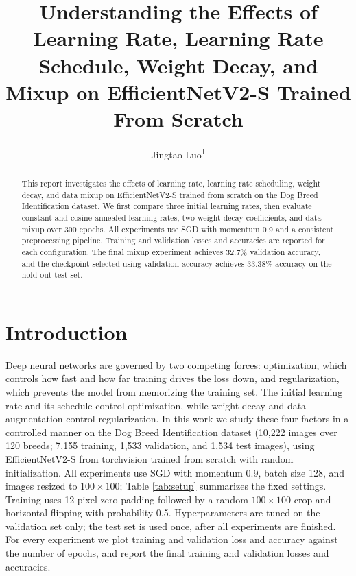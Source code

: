 \documentclass[letterpaper]{article} %
\title{Understanding the Effects of Learning Rate, Learning Rate Schedule, Weight Decay, and Mixup on EfficientNetV2-S Trained From Scratch}
\author{
    Jingtao Luo\textsuperscript{\rm 1}
}
\begin{document}
\maketitle

\begin{abstract}
This report investigates the effects of learning rate, 
learning rate scheduling, weight decay, and data mixup on EfficientNetV2-S 
trained from scratch on the Dog Breed Identification dataset.
We first compare three initial learning rates, 
then evaluate constant and cosine-annealed learning rates, 
two weight decay coefficients, and data mixup
over 300 epochs. All experiments use SGD with momentum 0.9 and 
a consistent preprocessing pipeline. Training and validation 
losses and accuracies are reported for each configuration. 
The final mixup experiment achieves 32.7\% validation accuracy, 
and the checkpoint selected using validation accuracy achieves 33.38\%
accuracy on the hold-out test set.
\end{abstract}
\section{Introduction}

Deep neural networks are governed by two competing forces: optimization, which
controls how fast and how far training drives the loss down, and
regularization, which prevents the model from memorizing the training set.
The initial learning rate and its schedule control optimization, while weight
decay and data augmentation control regularization.  In this work we study
these four factors in a controlled manner on the Dog Breed Identification
dataset (10{,}222 images over 120 breeds; 7{,}155 training, 1{,}533
validation, and 1{,}534 test images), using EfficientNetV2-S from torchvision
\cite{tan2021efficientnetv2} trained from scratch with random initialization.
All experiments use SGD with momentum 0.9, batch size 128, and images resized
to $100\times100$; Table \ref{tab:setup} summarizes the fixed settings.
Training uses 12-pixel zero padding followed by a random
$100\times100$ crop and horizontal flipping with probability 0.5.
Hyperparameters are tuned on the validation set only; the test set is used
once, after all experiments are finished.  For every experiment we plot
training and validation loss and accuracy against the number of epochs, and
report the final training and validation losses and accuracies.
\end{document}
